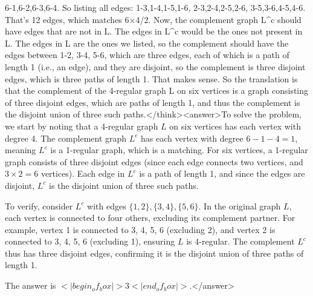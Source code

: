 6-1,6-2,6-3,6-4. So listing all edges: 1-3,1-4,1-5,1-6, 2-3,2-4,2-5,2-6, 3-5,3-6,4-5,4-6. That's 12 edges, which matches 6×4/2. Now, the complement graph L^c should have edges that are not in L. The edges in L^c would be the ones not present in L. The edges in L are the ones we listed, so the complement should have the edges between 1-2, 3-4, 5-6, which are three edges, each of which is a path of length 1 (i.e., an edge), and they are disjoint, so the complement is three disjoint edges, which is three paths of length 1. That makes sense. So the translation is that the complement of the 4-regular graph L on six vertices is a graph consisting of three disjoint edges, which are paths of length 1, and thus the complement is the disjoint union of three such paths.</think><answer>To solve the problem, we start by noting that a 4-regular graph \( L \) on six vertices has each vertex with degree 4. The complement graph \( L^c \) has each vertex with degree \( 6 - 1 - 4 = 1 \), meaning \( L^c \) is a 1-regular graph, which is a matching. For six vertices, a 1-regular graph consists of three disjoint edges (since each edge connects two vertices, and \( 3 \times 2 = 6 \) vertices). Each edge in \( L^c \) is a path of length 1, and since the edges are disjoint, \( L^c \) is the disjoint union of three such paths.

To verify, consider \( L^c \) with edges \( \{1,2\}, \{3,4\}, \{5,6\} \). In the original graph \( L \), each vertex is connected to four others, excluding its complement partner. For example, vertex 1 is connected to 3, 4, 5, 6 (excluding 2), and vertex 2 is connected to 3, 4, 5, 6 (excluding 1), ensuring \( L \) is 4-regular. The complement \( L^c \) thus has three disjoint edges, confirming it is the disjoint union of three paths of length 1.

The answer is \(<|begin_of_box|>3<|end_of_box|>\).</answer>